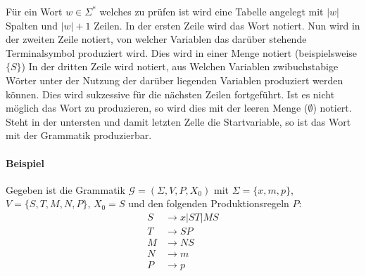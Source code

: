 \documentclass[a4paper, 11pt, accentcolor = tud3b]{tudreport}
\begin{document}
            Für ein Wort $ w \in \Sigma ^ * $ welches zu prüfen ist wird eine Tabelle angelegt mit $ \vert w \vert $ Spalten und $ \vert w \vert + 1 $ Zeilen. In der ersten Zeile wird das Wort notiert. Nun wird in der zweiten Zeile notiert, von welcher Variablen das darüber stehende Terminalsymbol produziert wird. Dies wird in einer Menge notiert (beispielsweise $ \{ S \} $) In der dritten Zeile wird notiert, aus Welchen Variablen zwibuchstabige Wörter unter der Nutzung der darüber liegenden Variablen produziert werden können. Dies wird sukzessive für die nächsten Zeilen fortgeführt. Ist es nicht möglich das Wort zu produzieren, so wird dies mit der leeren Menge ($ \emptyset $) notiert. Steht in der untersten und damit letzten Zelle die Startvariable, so ist das Wort mit der Grammatik produzierbar.

            \paragraph{Beispiel}
                Gegeben ist die Grammatik $ \mathcal{G} = (\Sigma, V, P, X _ 0) $ mit $ \Sigma = \{ x, m, p \} $, $ V = \{ S, T, M, N, P \} $, $ X _ 0 = S $ und den folgenden Produktionsregeln $ P $:
                \begin{equation*}
                    \begin{split}
                        S & \rightarrow x | ST | MS \\
                        T & \rightarrow SP          \\
                        M & \rightarrow NS          \\
                        N & \rightarrow m           \\
                        P & \rightarrow p           \\
                    \end{split}
                \end{equation*}
\end{document}
